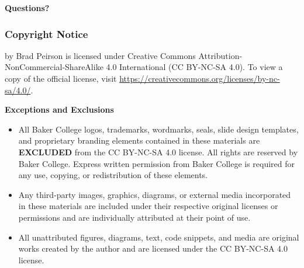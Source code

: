 \begin{frame}
    \centering
    {\Huge \textbf{\textcolor{BakerADARed}{Questions?}}}
\end{frame}

\begin{frame}
    \frametitle{Copyright Notice}
    
    {\footnotesize
    \PresTitle {} by Brad Peirson is licensed under Creative Commons Attribution-NonCommercial-ShareAlike 4.0 International (CC BY-NC-SA 4.0). To view a copy of the official license, visit \href{https://creativecommons.org/licenses/by-nc-sa/4.0/}{https://creativecommons.org/licenses/by-nc-sa/4.0/}.

    \vspace{0.5em}

    \textbf{Exceptions and Exclusions}

    \begin{itemize}
        \item[Baker College Branding \& Trademarks:]All Baker College logos, trademarks, wordmarks, seals, slide design templates, and proprietary branding elements contained in these materials are \textbf{EXCLUDED} from the CC BY-NC-SA 4.0 license. All rights are reserved by Baker College. Express written permission from Baker College is required for any use, copying, or redistribution of these elements.
        \item[Third-Party Media \& Content:] Any third-party images, graphics, diagrams, or external media incorporated in these materials are included under their respective original licenses or permissions and are individually attributed at their point of use. 
        \item[Original Author Content:] All unattributed figures, diagrams, text, code snippets, and media are original works created by the author and are licensed under the CC BY-NC-SA 4.0 license.
    \end{itemize}
    \par}
\end{frame}




